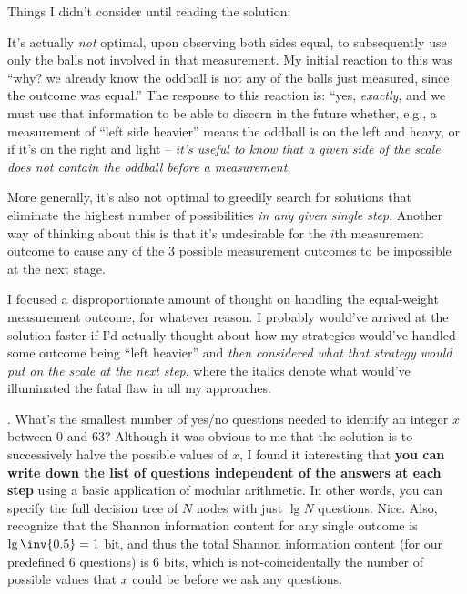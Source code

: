 \documentclass[11pt]{article}
\newcommand\myspace[1][]{\vspace{#1\bigskipamount}}
\newcommand\p{\Needspace{10\baselineskip} \noindent}
\begin{document}
Things I didn't consider until reading the solution:
\begin{compactitem}
	\item It's actually \textit{not} optimal, upon observing both sides equal, to subsequently use only the balls not involved in that measurement. My initial reaction to this was ``why? we already know the oddball is not any of the balls just measured, since the outcome was equal.'' The response to this reaction is: ``yes, \textit{exactly}, and we must use that information to be able to discern in the future whether, e.g., a measurement of ``left side heavier'' means the oddball is on the left and heavy, or if it's on the right and light -- \textit{it's useful to know that a given side of the scale does not contain the oddball before a measurement}.
	
	\item More generally, it's also not optimal to greedily search for solutions that eliminate the highest number of possibilities \textit{in any given single step}. Another way of thinking about this is that it's undesirable for the $i$th measurement outcome to cause any of the 3 possible measurement outcomes to be impossible at the next stage.
	
	\item I focused a disproportionate amount of thought on handling the equal-weight measurement outcome, for whatever reason. I probably would've arrived at the solution faster if I'd actually thought about how my strategies would've handled some outcome being ``left heavier'' and \textit{then considered what that strategy would put on the scale at the next step}, where the italics denote what would've illuminated the fatal flaw in all my approaches. 
\end{compactitem}


\myspace
\p {}. What's the smallest number of yes/no questions needed to identify an integer $x$ between 0 and 63? Although it was obvious to me that the solution is to successively halve the possible values of $x$, I found it interesting that \textbf{you can write down the list of questions independent of the answers at each step} using a basic application of modular arithmetic. In other words, you can specify the full decision tree of $N$ nodes with just $\lg N$ questions. Nice. Also, recognize that the Shannon information content for any single outcome is $\lg\inv{0.5} = 1$ bit, and thus the total Shannon information content (for our predefined 6 questions) is 6 bits, which is not-coincidentally the number of possible values that $x$ could be before we ask any questions.\\
\end{document}

